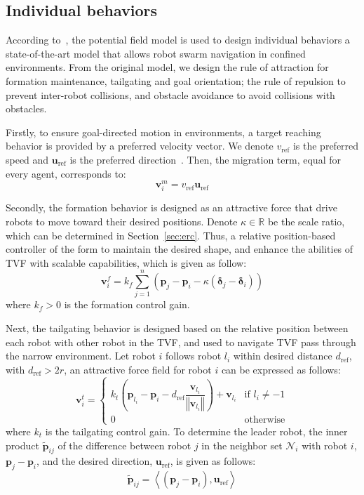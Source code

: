 \subsection{Individual behaviors}
According to~\cite{Vsrhelyi2018}, the potential field model is used to design individual behaviors a state-of-the-art model that allows robot swarm navigation in confined environments. From the original model, we design the rule of attraction for formation maintenance, tailgating and goal orientation; the rule of repulsion to prevent inter-robot collisions, and obstacle avoidance to avoid collisions with 
obstacles. 

Firstly, to ensure goal-directed motion in environments, a target reaching behavior is provided by a preferred velocity vector. We denote $v_\text{ref}$ is the preferred speed and $\mathbf{u}_\text{ref}$ is the preferred direction~\cite{6095129}. Then, the migration term, equal for every agent, corresponds to:
\begin{equation}
    \mathbf{v}_i^m=v_\text{ref}\mathbf{u}_\text{ref}
\end{equation}

Secondly, the formation behavior is designed as an attractive force that drive robots to move toward their desired positions. Denote $\kappa\in\mathbb{R}$ be the scale ratio, which can be determined in Section~\ref{sec:erc}. Thus, a relative position-based controller of the form to maintain the desired shape, and enhance the abilities of TVF with scalable capabilities, which is given as follow:
\begin{equation}
    \mathbf{v}^f_i=k_f\sum_{j=1}^n{\left(\mathbf{p}_j-\mathbf{p}_i-\kappa\left(\mathbf{\delta}_j-\mathbf{\delta}_i\right)\right)}
    \label{eqn:1uf}
\end{equation}
where $k_f>0$ is the formation control gain.

Next, the tailgating behavior is designed based on the relative position between each robot with other robot in the TVF, and used to navigate TVF pass through the narrow environment. Let robot $i$ follows robot ${l_i}$ within desired distance $d_\text{ref}$, with $d_\text{ref}>2r$,  an attractive force field for robot $i$ can be expressed as follows:
\begin{equation}
    \mathbf{v}_i^t=\begin{cases}
k_t\left(\mathbf{p}_{l_i}-\mathbf{p}_i-d_\text{ref}\dfrac{\mathbf{v}_{l_i}}{\left\Vert \mathbf{v}_{l_i}\right\Vert}\right)+\mathbf{v}_{l_i} & \text{if } l_i\neq-1\\
0 & \text{otherwise}
\end{cases}
    \label{eqn:1ut}
\end{equation}
where $k_t$ is the tailgating control gain. To determine the leader robot, the inner product $\tilde{\mathbf{p}}_{ij}$ of the difference between robot $j$ in the neighbor set $\mathcal{N}_i$ with robot $i$, $\mathbf{p}_j-\mathbf{p}_i$, and the desired direction, $\mathbf{u}_\text{ref}$, is given as follows:
\begin{equation}
    \tilde{\mathbf{p}}_{ij} = \left\langle (\mathbf{p}_j-\mathbf{p}_i),\mathbf{u}_\text{ref}\right\rangle
    \label{eqn:1tildep}
\end{equation}

